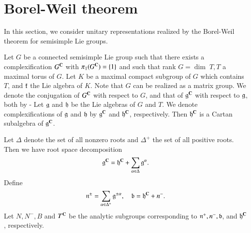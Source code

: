 \section{Borel-Weil theorem}\label{art15-sec-2}

In this section, we consider unitary representations realized by the Borel-Weil theorem for semisimple Lie groups.

Let $G$ be a connected semisimple Lie group such that there exists a complexification $G^{\mathbf{C}}$ with $\pi_{1}(G^{\mathbf{C}})= \{1\}$ and such that rank $G=\dim\; T, T$ a maximal torus of $G$. Let $K$ be a maximal compact subgroup of $G$ which contains $T$, and $\mathfrak{k}$ the Lie algebra of $K$. Note that $G$ can be realized as a matrix group. We denote the conjugation of $G^{\mathbf{C}}$ with respect to $G$, and that of $\mathfrak{g}^{\mathbf{C}}$ with respect to $\mathfrak{g}$, both by - Let $\mathfrak{g}$ and $\mathfrak{h}$ be the Lie algebras of $G$ and $T$. We denote complexifications of $\mathfrak{g}$ and $\mathfrak{h}$ by $\mathfrak{g}^{\mathbf{C}}$ and $\mathfrak{h}^{\mathbf{C}}$, respectively. Then $\mathfrak{h}^{\mathbf{C}}$ is a Cartan subalgebra of $\mathfrak{g}^{\mathbf{C}}$.

Let $\Delta$ denote the set of all nonzero roots and $\Delta^{+}$ the set of all positive roots. Then we have root space decomposition
$$
\mathfrak{g}^{\mathbf{C}} = \mathfrak{h}^{\mathbf{C}} + \sum\limits_{\alpha \in \Delta}\mathfrak{g}^{\alpha}.
$$
Define
$$
\mathfrak{n}^{\pm} = \sum\limits_{\alpha \in \Delta^{+}}\mathfrak{g}^{\pm \alpha}, \quad \mathfrak{b}= \mathfrak{h}^{\mathbf{C}} + n^{-}.
$$
Let $N, N^{-}, B$ and $T^{\mathbf{C}}$ be the analytic subgroups corresponding to $\mathfrak{n}^{+}, n^{-}, \mathfrak{b}$, and $\mathfrak{h}^{\mathbf{C}}$, respectively.

